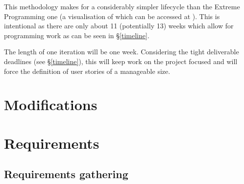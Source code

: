 This methodology makes for a considerably simpler lifecycle than the Extreme Programming one (a visualisation of which can be accessed at \cite{xp-lifecycle}). This is intentional as there are only about 11 (potentially 13) weeks which allow for programming work as can be seen in \S\ref{timeline}.



The length of one iteration will be one week. Considering the tight deliverable deadlines (see \S\ref{timeline}), this will keep work on the project focused and will force the definition of user stories of a manageable size.



\section{Modifications}

\section{Requirements}


\subsection{Requirements gathering}


